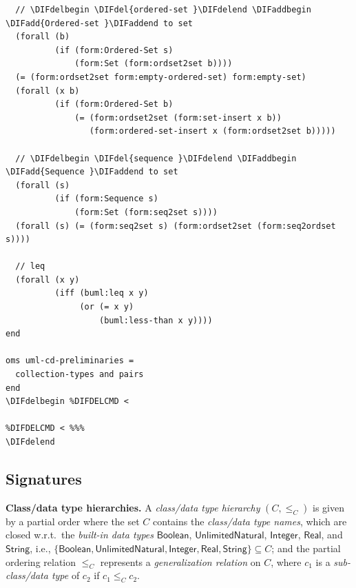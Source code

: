 \documentclass[10pt,fleqn,final]{scrreprt}
\newenvironment{definitions}[0]{\medskip }{}
\newcommand{\uml}[1]{\textsf{#1}}
\providecommand{\DIFadd}[1]{{\protect\color{blue}\uwave{#1}}} %
\providecommand{\DIFdel}[1]{{\protect\color{red}\sout{#1}}}                      %
\providecommand{\DIFaddbegin}{} %
\providecommand{\DIFaddend}{} %
\providecommand{\DIFdelbegin}{} %
\providecommand{\DIFdelend}{} %
\begin{document}
\begin{definitions}
\begin{lstlisting}
  // \DIFdelbegin \DIFdel{ordered-set }\DIFdelend \DIFaddbegin \DIFadd{Ordered-set }\DIFaddend to set
  (forall (b)
          (if (form:Ordered-Set s)
              (form:Set (form:ordset2set b))))
  (= (form:ordset2set form:empty-ordered-set) form:empty-set)
  (forall (x b)
          (if (form:Ordered-Set b)
              (= (form:ordset2set (form:set-insert x b))
                 (form:ordered-set-insert x (form:ordset2set b)))))

  // \DIFdelbegin \DIFdel{sequence }\DIFdelend \DIFaddbegin \DIFadd{Sequence }\DIFaddend to set
  (forall (s)
          (if (form:Sequence s)
              (form:Set (form:seq2set s))))
  (forall (s) (= (form:seq2set s) (form:ordset2set (form:seq2ordset s))))

  // leq
  (forall (x y)
          (iff (buml:leq x y)
               (or (= x y)
                   (buml:less-than x y))))
end

oms uml-cd-preliminaries =
  collection-types and pairs
end
\DIFdelbegin %DIFDELCMD < 

%DIFDELCMD < %%%
\DIFdelend \end{lstlisting}


\DIFdelbegin %
\DIFdelend \DIFaddbegin \subsection{Signatures}
\DIFaddend 

\DIFdelbegin %
\DIFdelend \textbf{Class/data type hierarchies.}  A \emph{class/data type
  hierarchy} $(C, {\leq_C})$
is given by a partial order where the set $C$
contains the \emph{class/data type names}, which are closed w.r.t.\ the
\emph{built-in data types} $\mathsf{Boolean}$,
$\mathsf{UnlimitedNatural}$,
$\mathsf{Integer}$,
$\mathsf{Real}$,
and $\mathsf{String}$,
i.e.,
$\{ \mathsf{Boolean}, \mathsf{UnlimitedNatural},\allowbreak
\mathsf{Integer}, \mathsf{Real}, \mathsf{String} \} \subseteq C$;
and the partial ordering relation $\leq_C$ represents a
\emph{generalization relation} on $C$, where $c_1$ is a
\emph{sub-class/data type} of $c_2$ if $c_1 \leq_C c_2$.


\end{definitions}
\end{document}
